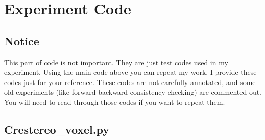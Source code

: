 \section*{Experiment Code}
\subsection*{Notice}
This part of code is not important. They are just test codes used in my experiment. Using the main code above you can repeat my work. I provide these codes just for your reference. These codes are not carefully annotated, and some old experiments (like forward-backward consistency checking) are commented out. You will need to read through those codes if you want to repeat them.
\subsection*{Crestereo\_voxel.py}
